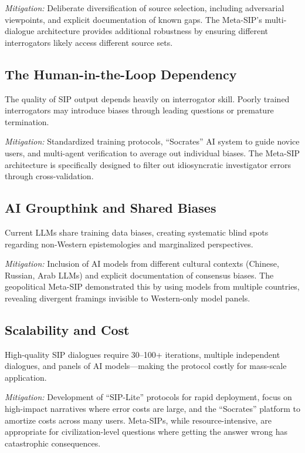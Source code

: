\documentclass[11pt,a4paper]{article}
\begin{document}
\begin{small}
\textit{Mitigation:} Deliberate diversification of source selection, including adversarial viewpoints, and explicit documentation of known gaps. The Meta-SIP's multi-dialogue architecture provides additional robustness by ensuring different interrogators likely access different source sets.

\subsection{The Human-in-the-Loop Dependency}

The quality of SIP output depends heavily on interrogator skill. Poorly trained interrogators may introduce biases through leading questions or premature termination.

\textit{Mitigation:} Standardized training protocols, ``Socrates'' AI system to guide novice users, and multi-agent verification to average out individual biases. The Meta-SIP architecture is specifically designed to filter out idiosyncratic investigator errors through cross-validation.

\subsection{AI Groupthink and Shared Biases}

Current LLMs share training data biases, creating systematic blind spots regarding non-Western epistemologies and marginalized perspectives.

\textit{Mitigation:} Inclusion of AI models from different cultural contexts (Chinese, Russian, Arab LLMs) and explicit documentation of consensus biases. The geopolitical Meta-SIP demonstrated this by using models from multiple countries, revealing divergent framings invisible to Western-only model panels.

\subsection{Scalability and Cost}

High-quality SIP dialogues require 30--100+ iterations, multiple independent dialogues, and panels of AI models---making the protocol costly for mass-scale application.

\textit{Mitigation:} Development of ``SIP-Lite'' protocols for rapid deployment, focus on high-impact narratives where error costs are large, and the ``Socrates'' platform to amortize costs across many users. Meta-SIPs, while resource-intensive, are appropriate for civilization-level questions where getting the answer wrong has catastrophic consequences.


\end{small}
\end{document}
